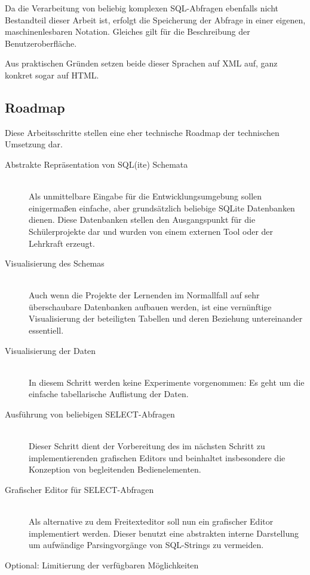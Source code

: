 \documentclass[paper=a4,fontsize=11pt,parskip=half]{scrartcl}
\begin{document}
Da die Verarbeitung von beliebig komplexen SQL-Abfragen ebenfalls nicht Bestandteil dieser Arbeit ist, erfolgt die Speicherung der Abfrage in einer eigenen, maschinenlesbaren Notation. Gleiches gilt für die Beschreibung der Benutzeroberfläche.

Aus praktischen Gründen setzen beide dieser Sprachen auf XML auf, ganz konkret sogar auf HTML.

\subsection{Roadmap}

Diese Arbeitsschritte stellen eine eher technische Roadmap der technischen Umsetzung dar.

\begin{description}
\item[Abstrakte Repräsentation von SQL(ite) Schemata] \hfill\\
  Als unmittelbare Eingabe für die Entwicklungsumgebung sollen einigermaßen einfache, aber grundsätzlich beliebige SQLite Datenbanken dienen. Diese Datenbanken stellen den Ausgangspunkt für die Schülerprojekte dar und wurden von einem externen Tool oder der Lehrkraft erzeugt.
\item[Visualisierung des Schemas] \hfill\\
  Auch wenn die Projekte der Lernenden im Normallfall auf sehr überschaubare Datenbanken aufbauen werden, ist eine vernünftige Visualisierung der beteiligten Tabellen und deren Beziehung untereinander essentiell.
\item[Visualisierung der Daten] \hfill\\
  In diesem Schritt werden keine Experimente vorgenommen: Es geht um die einfache tabellarische Auflistung der Daten.
\item[Ausführung von beliebigen SELECT-Abfragen] \hfill\\
  Dieser Schritt dient der Vorbereitung des im nächsten Schritt zu implementierenden grafischen Editors und beinhaltet insbesondere die Konzeption von begleitenden Bedienelementen.
\item[Grafischer Editor für SELECT-Abfragen] \hfill\\
  Als alternative zu dem Freitexteditor soll nun ein grafischer Editor implementiert werden. Dieser benutzt eine abstrakten interne Darstellung um aufwändige Parsingvorgänge von SQL-Strings zu vermeiden.
\item[Optional: Limitierung der verfügbaren Möglichkeiten] \hfill
  
\end{description}

\listoftodos[Notes]

\printbibliography
\end{document}
